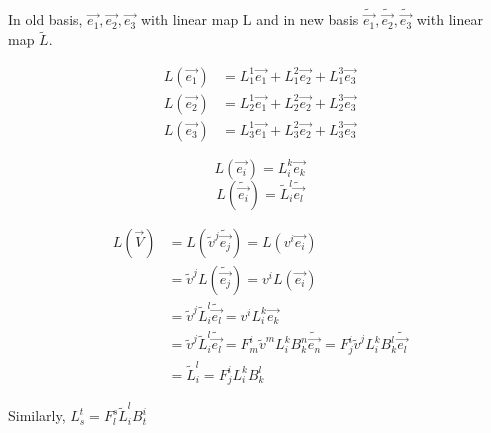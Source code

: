 \documentclass{article}
\begin{document}
	In old basis, $\overrightarrow{e_{1}},\overrightarrow{e_{2}},\overrightarrow{e_{3}}$ with linear map L and in new basis $\widetilde{\overrightarrow{e_{1}}},\widetilde{\overrightarrow{e_{2}}},\widetilde{\overrightarrow{e_{3}}}$ with linear map $\widetilde{L}$.
	
	\begin{center}
		\begin{align*}
			L(\overrightarrow{e_{1}}) &= L^{1}_{1}\overrightarrow{e_{1}} + L^{2}_{1}\overrightarrow{e_{2}} + L^{3}_{1}\overrightarrow{e_{3}}\\
			L(\overrightarrow{e_{2}}) &= L^{1}_{2}\overrightarrow{e_{1}} + L^{2}_{2}\overrightarrow{e_{2}} + L^{3}_{2}\overrightarrow{e_{3}}\\
			L(\overrightarrow{e_{3}}) &= L^{1}_{3}\overrightarrow{e_{1}} + L^{2}_{3}\overrightarrow{e_{2}} + L^{3}_{3}\overrightarrow{e_{3}}
		\end{align*}
	\end{center}

	$$L(\overrightarrow{e_{i}}) = L^{k}_{i}\overrightarrow{e_{k}}$$
	$$L(\widetilde{\overrightarrow{e_{i}}}) = \widetilde{L}^{l}_{i}\widetilde{\overrightarrow{e_{l}}}$$
	
	\begin{equation}
		\begin{split}
			L(\overrightarrow{V}) &= L(\widetilde{v}^{j}\widetilde{\overrightarrow{e_{j}}}) = L(v^{i}\overrightarrow{e_{i}})\\
								  &= \widetilde{v}^{j}L(\widetilde{\overrightarrow{e_{j}}}) = v^{i}L(\overrightarrow{e_{i}})\\
								  &= \widetilde{v}^{j}\widetilde{L}^{l}_{i}\widetilde{\overrightarrow{e_{l}}} = v^{i}L^{k}_{i}\overrightarrow{e_{k}}\\
								  &= \widetilde{v}^{j}\widetilde{L}^{l}_{i}\widetilde{\overrightarrow{e_{l}}} = F^{i}_{m}\widetilde{v}^{m}L^{k}_{i} B^{n}_{k}\widetilde{\overrightarrow{e_{n}}}= F^{i}_{j}\widetilde{v}^{j}L^{k}_{i} B^{l}_{k}\widetilde{\overrightarrow{e_{l}}}\\
								  &= \widetilde{L}^{l}_{i} = F^{i}_{j}L^{k}_{i}B^{l}_{k}
		\end{split}
	\end{equation}

	Similarly, $L_{s}^{t} = F_{l}^{s}\widetilde{L}^{l}_{i}B^{i}_{t}$
	
\end{document}

